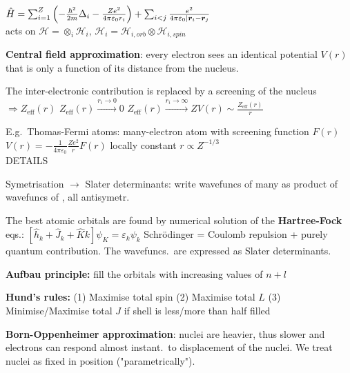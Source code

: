 \begin{squishlist}
    \item $\hat{H} = \sum_{i=1}^{Z}\left( - \frac{\hbar^2}{2m}\Delta_i - \frac{Ze^2}{4\pi \varepsilon_0 r_i}\right) + \sum_{i < j} \frac{e^2}{4\pi \varepsilon_0 |\bm{r}_i - \bm{r}_j}$ \\
    acts on $\mathcal{H} = \otimes_i \mathcal{H}_i,\, \mathcal{H}_i =  \mathcal{H}_{i, orb} \otimes \mathcal{H}_{i, spin}$
    \item \textbf{Central field approximation}: every electron sees an identical potential $V(r)$ that is only a function of its distance from the nucleus.
    
    \item The inter-electronic contribution is replaced by a screening of the nucleus  \\ $\Longrightarrow Z_{\mathrm{eff}}(r)$ \quad $Z_{\mathrm{eff}}(r) \overset{r_i\rightarrow 0}{\rightarrow} 0$ \quad $Z_{\mathrm{eff}}(r) \overset{r_i\rightarrow \infty}{\rightarrow} Z$\quad $V(r) \sim \frac{Z_{\mathrm{eff}}(r)}{r}$
    \item E.g.\ Thomas-Fermi atoms: many-electron atom with screening function $F(r)$ \\
    $V(r) = -\frac{1}{4 \pi \varepsilon_0} \frac{Z e^2}{r} F(r)$ locally constant \qquad
    $r \propto Z^{-1/3}$ \\
    DETAILS
    \item Symetrisation $\rightarrow$ Slater determinants: write wavefuncs of many \elec as product of wavefuncs of \elec, all antisymetr.
    \item The best atomic orbitals are found by numerical solution of the \textbf{Hartree-Fock} eqs.:
    $\left[\hat{h}_k + \hat{J}_k + \hat{K}k\right]\psi_K = \varepsilon_k \psi_k$ \quad
    Schrödinger = Coulomb repulsion + purely quantum contribution.
    The wavefuncs.\ are expressed as Slater determinants.

    \item \textbf{Aufbau principle:} fill the orbitals with increasing values of $n+l$
    \item \textbf{Hund's rules:} (1) Maximise total spin (2) Maximise total $L$ (3) Minimise/Maximise total $J$ if shell is less/more than half filled
\end{squishlist}

\textbf{Born-Oppenheimer approximation}: nuclei are heavier, thus slower and electrons can respond almost instant.\ to displacement of the nuclei. We treat nuclei as fixed in position ("parametrically").

